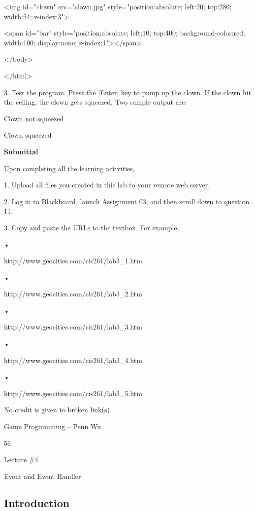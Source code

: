 \documentclass[
]{article}
\begin{document}
\textless img id="clown" src="clown.jpg" style="position:absolute;
left:20; top:280; width:54; z-index:3"\textgreater{}

\textless span id="bar" style="position:absolute; left:10; top:400;
background-color:red; width:100; display:none;
z-index:1"\textgreater\textless/span\textgreater{}

\textless/body\textgreater{}

\textless/html\textgreater{}

3. Test the program. Press the {[}Enter{]} key to pump up the clown. If
the clown hit the ceiling, the clown gets squeezed. Two sample output
are:

Clown not squeezed

Clown squeezed

\textbf{Submittal}

Upon completing all the learning activities,

1. Upload all files you created in this lab to your remote web server.

2. Log in to Blackboard, launch Assignment 03, and then scroll down to
question 11.

3. Copy and paste the URLs to the textbox. For example,

•

http://www.geocities.com/cis261/lab3\_1.htm

•

http://www.geocities.com/cis261/lab3\_2.htm

•

http://www.geocities.com/cis261/lab3\_3.htm

•

http://www.geocities.com/cis261/lab3\_4.htm

•

http://www.geocities.com/cis261/lab3\_5.htm

No credit is given to broken link(s).

Game Programming -- Penn Wu

56

\protect\hypertarget{index_split_004.htmlux5cux23p57}{}{}

Lecture \#4

Event and Event Handler

\protect\hypertarget{index_split_005.html}{}{}

\hypertarget{index_split_005.htmlux5cux23calibre_pb_4}{%
\subsection{Introduction}\label{index_split_005.htmlux5cux23calibre_pb_4}}
\end{document}
